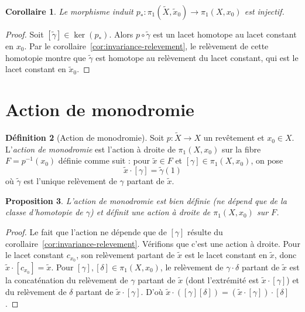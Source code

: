 \documentclass[12pt,a4paper,openany]{book}
\theoremstyle{definition}
\newtheorem{definition}{Définition}[chapter]
\theoremstyle{plain}
\newtheorem{proposition}[definition]{Proposition}
\newtheorem{corollaire}[definition]{Corollaire}
\theoremstyle{remark}
\begin{document}
\begin{corollaire}\label{cor:injectivite-p-star}
Le morphisme induit $p_* \colon \pi_1(\widetilde{X}, \tilde{x}_0) \to \pi_1(X, x_0)$
est injectif.
\end{corollaire}

\begin{proof}
Soit $[\tilde{\gamma}] \in \ker(p_*)$. Alors $p \circ \tilde{\gamma}$ est un lacet
homotope au lacet constant en $x_0$. Par le corollaire~\ref{cor:invariance-relevement},
le relèvement de cette homotopie montre que $\tilde{\gamma}$ est homotope au relèvement
du lacet constant, qui est le lacet constant en $\tilde{x}_0$.
\end{proof}

\section{Action de monodromie}\label{sec:monodromie}

\begin{definition}[Action de monodromie]\label{def:monodromie}
Soit $p \colon \widetilde{X} \to X$ un revêtement et $x_0 \in X$. L'\emph{action
de monodromie} est l'action à droite de $\pi_1(X, x_0)$ sur la fibre $F = p^{-1}(x_0)$
définie comme suit : pour $\tilde{x} \in F$ et $[\gamma] \in \pi_1(X, x_0)$, on pose
\[
\tilde{x} \cdot [\gamma] = \tilde{\gamma}(1)
\]
où $\tilde{\gamma}$ est l'unique relèvement de $\gamma$ partant de $\tilde{x}$.
\end{definition}

\begin{proposition}\label{prop:monodromie-bien-definie}
L'action de monodromie est bien définie (ne dépend que de la classe d'homotopie de $\gamma$)
et définit une action à droite de $\pi_1(X, x_0)$ sur $F$.
\end{proposition}

\begin{proof}
Le fait que l'action ne dépende que de $[\gamma]$ résulte du corollaire~\ref{cor:invariance-relevement}.
Vérifions que c'est une action à droite. Pour le lacet constant $c_{x_0}$, son relèvement
partant de $\tilde{x}$ est le lacet constant en $\tilde{x}$, donc $\tilde{x} \cdot [c_{x_0}] = \tilde{x}$.
Pour $[\gamma], [\delta] \in \pi_1(X, x_0)$, le relèvement de $\gamma \cdot \delta$
partant de $\tilde{x}$ est la concaténation du relèvement de $\gamma$ partant de $\tilde{x}$
(dont l'extrémité est $\tilde{x} \cdot [\gamma]$) et du relèvement de $\delta$
partant de $\tilde{x} \cdot [\gamma]$. D'où
$\tilde{x} \cdot ([\gamma][\delta]) = (\tilde{x} \cdot [\gamma]) \cdot [\delta]$.
\end{proof}
\end{document}
